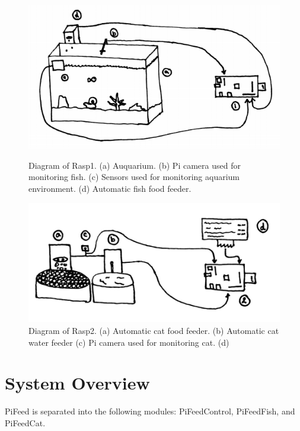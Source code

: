 \begin{figure}[H]
    \centering
    \begin{minipage}[b]{0.45\linewidth}
        \centering
        \captionsetup{justification=centering, margin = 0.5cm}
        \includegraphics[scale=0.3]{images/FishTank} 
        \caption{Diagram of Rasp1. (a) Auquarium. (b) Pi camera used for
        monitoring fish. (c) Sensors used for monitoring aquarium environment.
        (d) Automatic fish food feeder.}
        \label{fig:highFood}
    \end{minipage}
    \quad
    \begin{minipage}[b]{0.45\linewidth}
        \centering
        \captionsetup{justification=centering, margin = 0.5cm}
        \includegraphics[scale=0.4]{images/Cat} 
        \caption{Diagram of Rasp2. (a) Automatic cat food feeder. (b) Automatic
        cat water feeder (c) Pi camera used for monitoring cat. (d)}
        \label{fig:highCat}
    \end{minipage}
\end{figure}

\section{System Overview}
PiFeed is separated into the following modules: PiFeedControl, PiFeedFish, and
PiFeedCat.

